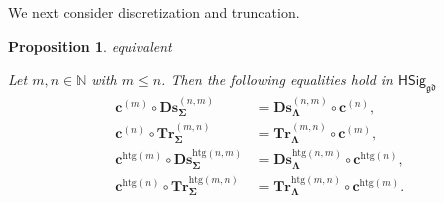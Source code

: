 \documentclass[a4paper, reqno]{amsbook}
\makeatletter
\newcommand{\sig}[1]{\mathbf{#1}}             %
\newcommand{\gd}{\mathfrak{gd}}              %
\newcommand{\htg}{\mathrm{htg}}                %
\newcommand{\bDs}{\mathbf{Ds}}
\newcommand{\bTr}{\mathbf{Tr}}
\theoremstyle{plain}
\newtheorem{proposition}[theorem]{Proposition}
\theoremstyle{definition}
\newcommand*{\CA@leanpending}{}
\newcommand*{\CA@leanrelation}{}
\newcommand*{\lean}[2]{%
  \ifcsname\string\color@lean@#1\endcsname\else
    \PackageError{main}{Unknown relation `#1' in \string\lean}{Use equivalent, weaker or stronger.}%
  \fi
  \gdef\CA@leanrelation{#1}%
  \gdef\CA@leanpending{#2}}
\makeatother
\begin{document}
We next consider discretization and truncation.

\begin{proposition}\label{PChangeSigDsTr}\lean{equivalent}{ChangeOfSignature.homogeneousDiscretization_comp,ChangeOfSignature.homogeneousTruncation_comp,ChangeOfSignature.heterogeneousDimension_comp}
Let $m,n\in\mathbb{N}$ with $m\leq n$.
Then the following equalities hold in $\mathsf{HSig}_{\gd}$
\begin{align*}
\mathbf{c}^{(m)}\circ\bDs^{(n,m)}_{\sig{\Sigma}}&=\bDs^{(n,m)}_{\sig{\Lambda}}\circ\mathbf{c}^{(n)},
\\
\mathbf{c}^{(n)}\circ\bTr^{(m,n)}_{\sig{\Sigma}}&=\bTr^{(m,n)}_{\sig{\Lambda}}\circ\mathbf{c}^{(m)},
\\
\mathbf{c}^{\htg(m)}\circ\bDs^{\htg(n,m)}_{\sig{\Sigma}}&=\bDs^{\htg(n,m)}_{\sig{\Lambda}}\circ\mathbf{c}^{\htg(n)},
\\
\mathbf{c}^{\htg(n)}\circ\bTr^{\htg(m,n)}_{\sig{\Sigma}}&=\bTr^{\htg(m,n)}_{\sig{\Lambda}}\circ\mathbf{c}^{\htg(m)}.
\end{align*}
\end{proposition}
\end{document}
